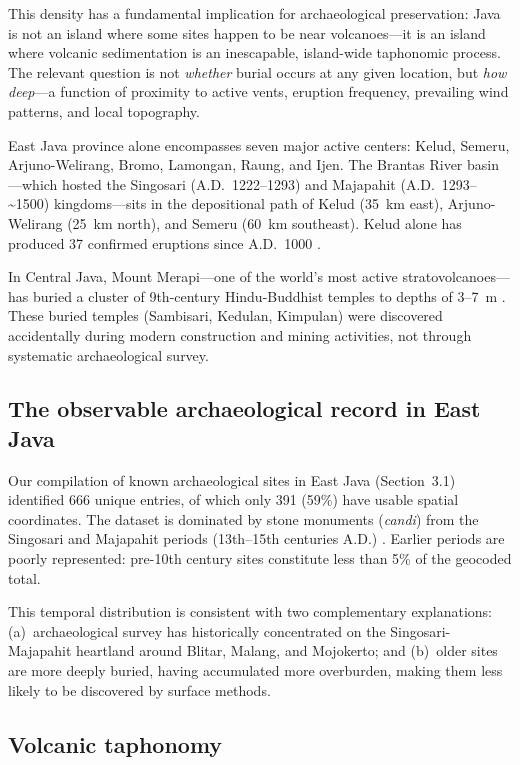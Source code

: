 \documentclass[12pt,letterpaper]{article}
\begin{document}
This density has a fundamental implication for archaeological preservation: Java is not an island where some sites happen to be near volcanoes---it is an island where volcanic sedimentation is an inescapable, island-wide taphonomic process. The relevant question is not \textit{whether} burial occurs at any given location, but \textit{how deep}---a function of proximity to active vents, eruption frequency, prevailing wind patterns, and local topography.

East Java province alone encompasses seven major active centers: Kelud, Semeru, Arjuno-Welirang, Bromo, Lamongan, Raung, and Ijen. The Brantas River basin---which hosted the Singosari (A.D.~1222--1293) and Majapahit (A.D.~1293--\textasciitilde 1500) kingdoms---sits in the depositional path of Kelud (35~km east), Arjuno-Welirang (25~km north), and Semeru (60~km southeast). Kelud alone has produced 37 confirmed eruptions since A.D.~1000 \citep{gvp2024,maeno2019}.

In Central Java, Mount Merapi---one of the world's most active stratovolcanoes---has buried a cluster of 9th-century Hindu-Buddhist temples to depths of 3--7~m \citep{lavigne2000,thouret2000}. These buried temples (Sambisari, Kedulan, Kimpulan) were discovered accidentally during modern construction and mining activities, not through systematic archaeological survey.

\subsection{The observable archaeological record in East Java}

Our compilation of known archaeological sites in East Java (Section~3.1) identified 666 unique entries, of which only 391 (59\%) have usable spatial coordinates. The dataset is dominated by stone monuments (\textit{candi}) from the Singosari and Majapahit periods (13th--15th centuries A.D.) \citep{kinney2003}. Earlier periods are poorly represented: pre-10th century sites constitute less than 5\% of the geocoded total.

This temporal distribution is consistent with two complementary explanations: (a)~archaeological survey has historically concentrated on the Singosari-Majapahit heartland around Blitar, Malang, and Mojokerto; and (b)~older sites are more deeply buried, having accumulated more overburden, making them less likely to be discovered by surface methods.

\subsection{Volcanic taphonomy}
\end{document}
